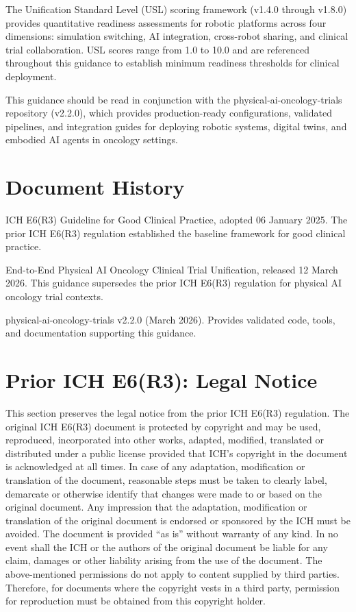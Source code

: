 \documentclass[11pt]{article}
\begin{document}
The Unification Standard Level (USL) scoring framework (v1.4.0 through v1.8.0) provides quantitative readiness assessments for robotic platforms across four dimensions: simulation switching, AI integration, cross-robot sharing, and clinical trial collaboration. USL scores range from 1.0 to 10.0 and are referenced throughout this guidance to establish minimum readiness thresholds for clinical deployment.

This guidance should be read in conjunction with the physical-ai-oncology-trials repository (v2.2.0), which provides production-ready configurations, validated pipelines, and integration guides for deploying robotic systems, digital twins, and embodied AI agents in oncology settings.

\section*{Document History}

\begin{description}[leftmargin=4cm,style=sameline]
\item[Prior Regulation] ICH E6(R3) Guideline for Good Clinical Practice, adopted 06 January 2025. The prior ICH E6(R3) regulation established the baseline framework for good clinical practice.
\item[Current Guidance] End-to-End Physical AI Oncology Clinical Trial Unification, released 12 March 2026. This guidance supersedes the prior ICH E6(R3) regulation for physical AI oncology trial contexts.
\item[Repository Reference] physical-ai-oncology-trials v2.2.0 (March 2026). Provides validated code, tools, and documentation supporting this guidance.
\end{description}

\clearpage
{}

\section*{Prior ICH E6(R3): Legal Notice}

This section preserves the legal notice from the prior ICH E6(R3) regulation. The original ICH E6(R3) document is protected by copyright and may be used, reproduced, incorporated into other works, adapted, modified, translated or distributed under a public license provided that ICH's copyright in the document is acknowledged at all times. In case of any adaptation, modification or translation of the document, reasonable steps must be taken to clearly label, demarcate or otherwise identify that changes were made to or based on the original document. Any impression that the adaptation, modification or translation of the original document is endorsed or sponsored by the ICH must be avoided. The document is provided ``as is'' without warranty of any kind. In no event shall the ICH or the authors of the original document be liable for any claim, damages or other liability arising from the use of the document. The above-mentioned permissions do not apply to content supplied by third parties. Therefore, for documents where the copyright vests in a third party, permission for reproduction must be obtained from this copyright holder.
\end{document}
